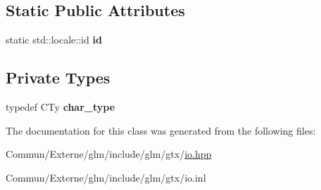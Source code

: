 \subsection*{Static Public Attributes}
\begin{DoxyCompactItemize}
\item 
static std\+::locale\+::id {\bfseries id}\hypertarget{classglm_1_1io_1_1format__punct_a763f60aeaecec9290917ed1d83b79838}{}\label{classglm_1_1io_1_1format__punct_a763f60aeaecec9290917ed1d83b79838}

\end{DoxyCompactItemize}
\subsection*{Private Types}
\begin{DoxyCompactItemize}
\item 
typedef C\+Ty {\bfseries char\+\_\+type}\hypertarget{classglm_1_1io_1_1format__punct_ae94c42484a4c5258ad7b2f0f029efdf3}{}\label{classglm_1_1io_1_1format__punct_ae94c42484a4c5258ad7b2f0f029efdf3}

\end{DoxyCompactItemize}


The documentation for this class was generated from the following files\+:\begin{DoxyCompactItemize}
\item 
Commun/\+Externe/glm/include/glm/gtx/\hyperlink{io_8hpp}{io.\+hpp}\item 
Commun/\+Externe/glm/include/glm/gtx/io.\+inl\end{DoxyCompactItemize}
